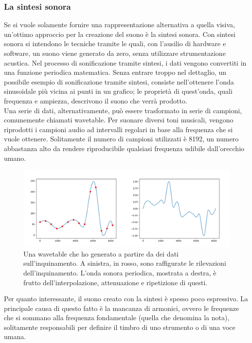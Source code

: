 \subsubsection{La sintesi sonora}
Se si vuole solamente fornire una rappresentazione alternativa a quella visiva, un'ottimo approccio per la creazione del suono è la sintesi sonora.
Con sintesi sonora si intendono le tecniche tramite le quali, con l'ausilio di hardware e software, un suono viene generato da zero, senza utilizzare strumentazione acustica.
Nel processo di sonificazione tramite sintesi, i dati vengono convertiti in una funzione periodica matematica.
Senza entrare troppo nel dettaglio, un possibile esempio di sonificazione tramite sintesi, consiste nell'ottenere l'onda sinusoidale più vicina ai punti in un grafico; le proprietà di quest'onda, quali frequenza e ampiezza, descrivono il suono che verrà prodotto.
\\
Una serie di dati, alternativamente, può essere trasformato in serie di campioni, comunemente chiamati wavetable.
Per suonare diversi toni musicali, vengono riprodotti i campioni audio ad intervalli regolari in base alla frequenza che si vuole ottenere.
Solitamente il numero di campioni utilizzati è 8192, un numero abbastanza alto da rendere riproducibile qualsiasi frequenza udibile dall'orecchio umano.
\begin{figure}[H]
  \includegraphics[width=\linewidth]{img/image.png}
  \caption{Una wavetable che ho generato a partire da dei dati sull'inquinamento.
  A sinistra, in rosso, sono raffigurate le rilevazioni dell'inquinamento. L'onda sonora periodica, mostrata a destra, è frutto dell'interpolazione, attenuazione e ripetizione di questi.}
  \label{fig:wavetable}
\end{figure}

 
Per quanto interessante, il suono creato con la sintesi è spesso poco espressivo.
La principale causa di questo fatto è la mancanza di armonici, ovvero le frequenze che si sommano alla frequenza fondamentale (quella che denomina la nota), solitamente responsabili per definire il timbro di uno strumento o di una voce umana.
